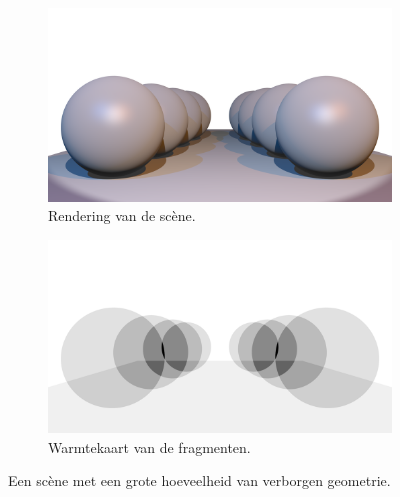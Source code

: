 \begin{figure}
  \begin{subfigure}[b]{.49\textwidth}
    \centering
    \includegraphics[width=\textwidth]{./img/raw/fds-scene/scene.png}
    \caption{Rendering van de sc\`ene.}
    \label{fig:fds-scene:scene}
  \end{subfigure} %
  \begin{subfigure}[b]{.49\textwidth}
    \centering
    \includegraphics[width=\textwidth]{./img/raw/fds-scene/heatmap.png}
    \caption{Warmtekaart van de fragmenten.}
    \label{fig:fds-scene:heatmap}
  \end{subfigure}
  \caption{Een sc\`ene met een grote hoeveelheid van verborgen geometrie.}
  \label{fig:fds-scene}
\end{figure}
